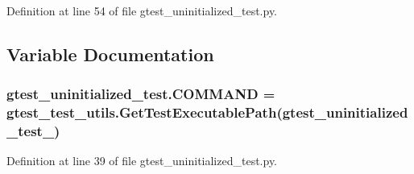 Definition at line 54 of file gtest\+\_\+uninitialized\+\_\+test.\+py.



\subsection{Variable Documentation}
\subsubsection[{\texorpdfstring{C\+O\+M\+M\+A\+ND}{COMMAND}}]{\setlength{\rightskip}{0pt plus 5cm}gtest\+\_\+uninitialized\+\_\+test.\+C\+O\+M\+M\+A\+ND = {\bf gtest\+\_\+test\+\_\+utils.\+Get\+Test\+Executable\+Path}(\textquotesingle{}gtest\+\_\+uninitialized\+\_\+test\+\_\+\textquotesingle{})}\hypertarget{namespacegtest__uninitialized__test_a77a36d59341a58a2e7f54f0b2e691bd7}{}\label{namespacegtest__uninitialized__test_a77a36d59341a58a2e7f54f0b2e691bd7}


Definition at line 39 of file gtest\+\_\+uninitialized\+\_\+test.\+py.

